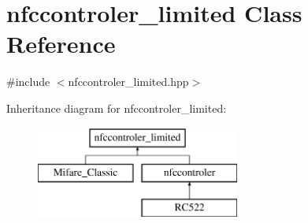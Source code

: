 \hypertarget{classnfccontroler__limited}{}\section{nfccontroler\+\_\+limited Class Reference}
\label{classnfccontroler__limited}


{\ttfamily \#include $<$nfccontroler\+\_\+limited.\+hpp$>$}

Inheritance diagram for nfccontroler\+\_\+limited\+:\begin{figure}[H]
\begin{center}
\leavevmode
\includegraphics[height=3.000000cm]{classnfccontroler__limited}
\end{center}
\end{figure}
